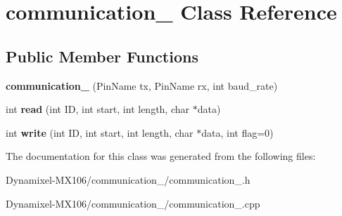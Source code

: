 \hypertarget{classcommunication__1}{}\section{communication\+\_ Class Reference}
\label{classcommunication__1}
\subsection*{Public Member Functions}
\begin{DoxyCompactItemize}
\item 
{\bfseries communication\+\_} (Pin\+Name tx, Pin\+Name rx, int baud\+\_\+rate)\hypertarget{classcommunication__1_a03b0e85ad36aa9bac39d0fc7663c77ca}{}\label{classcommunication__1_a03b0e85ad36aa9bac39d0fc7663c77ca}

\item 
int {\bfseries read} (int ID, int start, int length, char $\ast$data)\hypertarget{classcommunication__1_a81c6441018c25b1d7d3578a97fb0e712}{}\label{classcommunication__1_a81c6441018c25b1d7d3578a97fb0e712}

\item 
int {\bfseries write} (int ID, int start, int length, char $\ast$data, int flag=0)\hypertarget{classcommunication__1_a21d61cc68098426a4f916a1cd6504734}{}\label{classcommunication__1_a21d61cc68098426a4f916a1cd6504734}

\end{DoxyCompactItemize}


The documentation for this class was generated from the following files\+:\begin{DoxyCompactItemize}
\item 
Dynamixel-\/\+M\+X106/communication\+\_/communication\+\_.\+h\item 
Dynamixel-\/\+M\+X106/communication\+\_/communication\+\_.\+cpp\end{DoxyCompactItemize}
